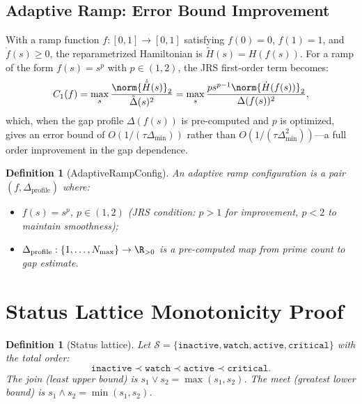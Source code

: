 \documentclass[11pt,letterpaper]{article}
\newtheorem{definition}[theorem]{Definition}
\theoremstyle{remark}
\begin{document}
\subsection{Adaptive Ramp: Error Bound Improvement}
\label{sec:adaptive-ramp}

With a ramp function $f : [0,1] \to [0,1]$ satisfying
$f(0) = 0$, $f(1) = 1$, and $\dot{f}(s) \geq 0$, the reparametrized
Hamiltonian is $\tilde{H}(s) = H(f(s))$. For a ramp of the form
$f(s) = s^p$ with $p \in (1,2)$, the JRS first-order term becomes:
\[
  C_1(f) = \max_s \frac{\norm{\dot{\tilde{H}}(s)}_2}{\tilde\Delta(s)^2}
  = \max_s \frac{p s^{p-1} \norm{\dot{H}(f(s))}_2}{\Delta(f(s))^2},
\]
which, when the gap profile $\Delta(f(s))$ is pre-computed and $p$
is optimized, gives an error bound of $O(1/(\tau\Delta_{\min}))$ rather
than $O(1/(\tau\Delta_{\min}^2))$---a full order improvement in the
gap dependence.

\begin{definition}[AdaptiveRampConfig]
\label{def:A-ramp-config}
An \emph{adaptive ramp configuration} is a pair $(f, \Delta_\text{profile})$
where:
\begin{itemize}
  \item $f(s) = s^p$, $p \in (1,2)$ (JRS condition: $p > 1$ for improvement,
    $p < 2$ to maintain smoothness);
  \item $\Delta_\text{profile} : \{1,\ldots,N_\text{max}\} \to \R_{>0}$
    is a pre-computed map from prime count to gap estimate.
\end{itemize}
\end{definition}

\section{Status Lattice Monotonicity Proof}
\label{sec:lattice}

\begin{definition}[Status lattice]
\label{def:A-lattice}
Let $\mathcal{S} = \{\texttt{inactive}, \texttt{watch}, \texttt{active},
\texttt{critical}\}$ with the total order:
\[
  \texttt{inactive} \prec \texttt{watch} \prec \texttt{active}
  \prec \texttt{critical}.
\]
The join (least upper bound) is $s_1 \vee s_2 = \max(s_1, s_2)$.
The meet (greatest lower bound) is $s_1 \wedge s_2 = \min(s_1, s_2)$.
\end{definition}
\end{document}
